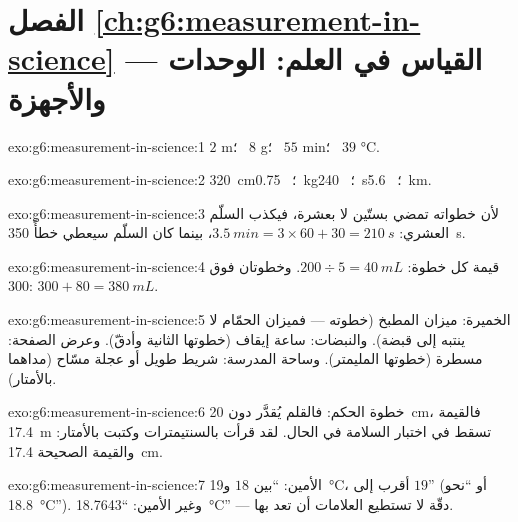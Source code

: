 \section*{الفصل \ref{ch:g6:measurement-in-science} --- القياس في العلم: الوحدات والأجهزة}

\begin{solution}{exo:g6:measurement-in-science:1}
$2$ \unit{m}؛ \ $8$ \unit{g}؛ \ $55$ \unit{min}؛ \ $39$
\unit{\celsius}.
\end{solution}

\begin{solution}{exo:g6:measurement-in-science:2}
\qty{320}{cm}؛ \ \qty{0.75}{kg}؛ \ \qty{240}{s}؛ \ \qty{5.6}{km}.
\end{solution}

\begin{solution}{exo:g6:measurement-in-science:3}
لأن خطواته تمضي بستّين لا بعشرة، فيكذب السلّم العشري:
$\qty{3.5}{min} = 3 \times 60 + 30 = \qty{210}{s}$، بينما كان
السلّم سيعطي خطأً \qty{350}{s}.
\end{solution}

\begin{solution}{exo:g6:measurement-in-science:4}
قيمة كل خطوة: $200 \div 5 = \qty{40}{mL}$. وخطوتان فوق $300$:
$300 + 80 = \qty{380}{mL}$.
\end{solution}

\begin{solution}{exo:g6:measurement-in-science:5}
الخميرة: ميزان المطبخ (خطوته  --- فميزان الحمّام لا ينتبه
إلى قبضة). والنبضات: ساعة إيقاف (خطوتها الثانية وأدقّ). وعرض
الصفحة: مسطرة (خطوتها المليمتر). وساحة المدرسة: شريط  طويل
أو عجلة مسّاح (مداهما بالأمتار).
\end{solution}

\begin{solution}{exo:g6:measurement-in-science:6}
خطوة الحكم: فالقلم يُقدَّر دون \qty{20}{cm}، فالقيمة
\qty{17.4}{m} تسقط في اختبار السلامة في الحال. لقد قرأت بالسنتيمترات وكتبت
بالأمتار: والقيمة الصحيحة \qty{17.4}{cm}.
\end{solution}

\begin{solution}{exo:g6:measurement-in-science:7}
الأمين: ``بين $18$ و\qty{19}{\celsius}، أقرب إلى $19$'' (أو
``نحو \qty{18.8}{\celsius}''). وغير الأمين:
``\qty{18.7643}{\celsius}'' --- دقّة لا تستطيع العلامات أن تعد
بها.
\end{solution}

